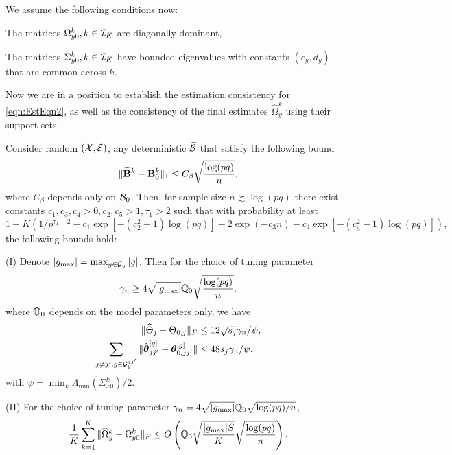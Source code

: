 We assume the following conditions now:
%

\vspace{1em}
 The matrices $\Omega_{y0}^k, k \in {\cal{I}}_K$ are diagonally dominant,

 The matrices $\Sigma_{y0}^k, k \in {\cal{I}}_K$ have bounded eigenvalues with constants $(c_y, d_y)$ that are common across $k$.
\vspace{1em}
%

Now we are in a position to establish the estimation consistency for \eqref{eqn:EstEqn2}, as well as the consistency of the final estimates $\widehat \Omega_y^k$ using their support sets.

\begin{theorem}\label{thm:thm-Theta}
Consider random $({\cal{X}}, {\cal{E}})$, any deterministic $\widetilde {{\cal{B}}}$ that satisfy the following bound
%
$$
\| \widetilde {{\mathbf{B}}}^k - {\mathbf{B}}_0^k \|_1 \leq C_\beta \sqrt{ \frac{ \log(pq)}{n}},
$$
%
where $C_\beta$ depends only on ${\cal{B}}_0$. Then, for sample size $n \succsim \log (pq)$ there exist constants $c_1, c_3, c_4 > 0, c_2, c_5 > 1, \tau_1 > 2$ such that with probability at least
%
$$
1 - K( 1/p^{\tau_1-2} - c_1 \exp [-(c_2^2-1) \log(pq)] - 2 \exp (- c_3 n) - c_4 \exp [-(c_5^2-1) \log(pq)]),
$$
the following bounds hold:

\noindent (I) Denote $|g_{\max}| = \max_{g \in {\cal{G}}_y} |g|$. Then for the choice of tuning parameter
%
$$
\gamma_n \geq 4 \sqrt{| g_{\max}|} {\mathbb{Q}}_0 \sqrt {\frac{ \log (p q)}{n}},
$$
%
where ${\mathbb{Q}}_0$ depends on the model parameters only, we have
%
\begin{align}
\| \widehat \Theta_j - \Theta_{0,j} \|_F & \leq 12 \sqrt{s_j} \gamma_n / \psi, \label{eqn:theta-norm-bound-1}\\
\sum_{j \neq j', g \in {\cal{G}}_y^{jj'}} \| \hat {{\boldsymbol{\theta}}}_{jj'}^{[g]} - {\boldsymbol{\theta}}_{0,jj'}^{[g]} \| & \leq 48 s_j \gamma_n / \psi. \label{eqn:theta-norm-bound-2}
\end{align}
%
{\colb with $\psi = \min_k \Lambda_{\min} (\Sigma_{x0}^k)/2$.}

\noindent (II) For the choice of tuning parameter $\gamma_n = 4 \sqrt{| g_{\max}|} {\mathbb{Q}}_0 \sqrt{\log (p q)/n}$,
%
\begin{align}\label{eqn:OmegaBounds0}
\frac{1}{K} \sum_{k=1}^K \| \widehat \Omega_y^k - \Omega_{y0}^k \|_F \leq
O \left( {\mathbb{Q}}_0 \sqrt{\frac{| g_{\max}| S}{K}} 
\sqrt {\frac{ \log (p q)}{n}} \right).
\end{align}
%
\end{theorem}

